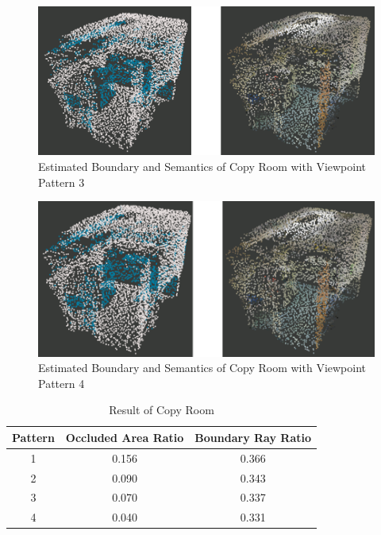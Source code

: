 \documentclass[11pt, a4paper,oneside,chapterprefix=false]{scrbook}
\begin{document}
\begin{figure}[H]
    \centering
    \includegraphics*[width=1.0\textwidth]{figures/copy 5.png}
    \caption{Estimated Boundary and Semantics of Copy Room with Viewpoint Pattern 3}
    \label{fig:copy 5}
\end{figure}

\begin{figure}[H]
    \centering
    \includegraphics*[width=1.0\textwidth]{figures/copy 6.png}
    \caption{Estimated Boundary and Semantics of Copy Room with Viewpoint Pattern 4}
    \label{fig:copy 6}
\end{figure}

\begin{table}[H]
    \centering
    \begin{tabular}{|c|c|c|}
        \hline
        \textbf{Pattern} & \textbf{Occluded Area Ratio} & \textbf{Boundary Ray Ratio} \\
        \hline
        1 & 0.156 & 0.366 \\
        2 & 0.090 & 0.343 \\
		3 & 0.070 & 0.337 \\
		4 & 0.040 & 0.331 \\
        \hline
    \end{tabular}
    \caption{Result of Copy Room}
    \label{tab:result of copy room}
\end{table}
\end{document}
